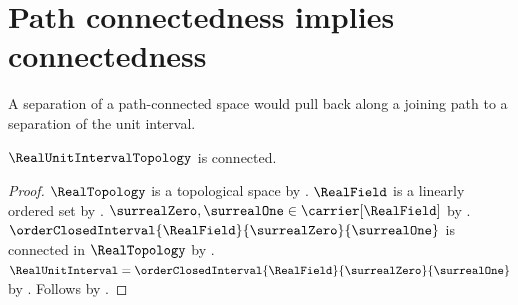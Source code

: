 \section{Path connectedness implies connectedness}




A separation of a path-connected space would pull back along a joining
path to a separation of the unit interval.

\begin{theorem}\label{real_unit_interval_is_connected}
    $\RealUnitIntervalTopology$ is connected.
\end{theorem}
\begin{proof}
    $\RealTopology$ is a topological space by .
    $\RealField$ is a linearly ordered set by .
    $\surrealZero,\surrealOne\in\carrier[\RealField]$ by
        .
    $\orderClosedInterval{\RealField}{\surrealZero}{\surrealOne}$ is connected in $\RealTopology$ by
        .
    $\RealUnitInterval=\orderClosedInterval{\RealField}{\surrealZero}{\surrealOne}$ by
        .
    Follows by .
\end{proof}

